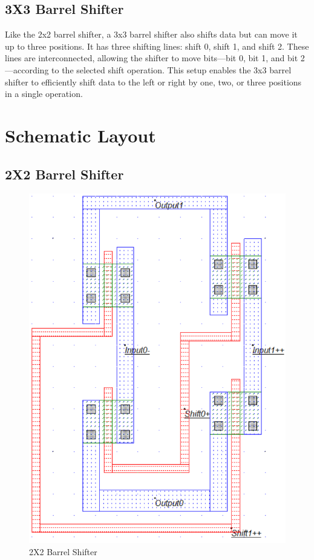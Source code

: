 \documentclass[a4paper,12pt]{article}
\begin{document}
		\subsection{3X3 Barrel Shifter}
		Like the 2x2 barrel shifter, a 3x3 barrel shifter also shifts data but can move it up to three positions. It has three shifting lines: shift 0, shift 1, and shift 2. These lines are interconnected, allowing the shifter to move bits—bit 0, bit 1, and bit 2—according to the selected shift operation. This setup enables the 3x3 barrel shifter to efficiently shift data to the left or right by one, two, or three positions in a single operation.
	\newpage
	\section{Schematic Layout }
	\subsection{2X2 Barrel Shifter}
	\begin{figure}[H]
		\centering
		\includegraphics[width=1\linewidth]{Images/2b}
		\caption{2X2 Barrel Shifter}
		\label{fig:2b}
	\end{figure}
\end{document}
